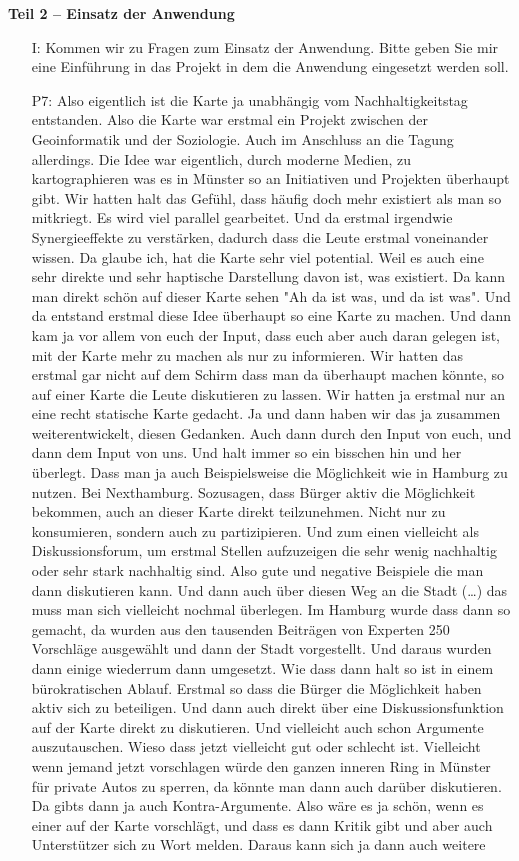 \textbf{Teil 2 -- Einsatz der Anwendung}
\begin{itemize}
    \item[I:] Kommen wir zu Fragen zum Einsatz der Anwendung. Bitte geben Sie mir eine Einf{\"u}hrung in das Projekt in dem die Anwendung eingesetzt werden soll.
    \item[P7:] Also eigentlich ist die Karte ja unabh{\"a}ngig vom Nachhaltigkeitstag entstanden. Also die Karte war erstmal ein Projekt zwischen der Geoinformatik und der Soziologie. Auch im Anschluss an die Tagung allerdings. Die Idee war eigentlich, durch moderne Medien, zu kartographieren was es in M{\"u}nster so an Initiativen und Projekten {\"u}berhaupt gibt. Wir hatten halt das Gef{\"u}hl, dass h{\"a}ufig doch mehr existiert als man so mitkriegt. Es wird viel parallel gearbeitet. Und da erstmal irgendwie Synergieeffekte zu verst{\"a}rken, dadurch dass die Leute erstmal voneinander wissen. Da glaube ich, hat die Karte sehr viel potential. Weil es auch eine sehr direkte und sehr haptische Darstellung davon ist, was existiert. Da kann man direkt sch{\"o}n auf dieser Karte sehen "Ah da ist was, und da ist was". Und da entstand erstmal diese Idee {\"u}berhaupt so eine Karte zu machen. Und dann kam ja vor allem von euch der Input, dass euch aber auch daran gelegen ist, mit der Karte mehr zu machen als nur zu informieren. Wir hatten das erstmal gar nicht auf dem Schirm dass man da {\"u}berhaupt machen k{\"o}nnte, so auf einer Karte die Leute diskutieren zu lassen. Wir hatten ja erstmal nur an eine recht statische Karte gedacht. Ja und dann haben wir das ja zusammen weiterentwickelt, diesen Gedanken. Auch dann durch den Input von euch, und dann dem Input von uns. Und halt immer so ein bisschen hin und her {\"u}berlegt. Dass man ja auch Beispielsweise die M{\"o}glichkeit wie in Hamburg zu nutzen. Bei Nexthamburg. Sozusagen, dass B{\"u}rger aktiv die M{\"o}glichkeit bekommen, auch an dieser Karte direkt teilzunehmen. Nicht nur zu konsumieren, sondern auch zu partizipieren. Und zum einen vielleicht als Diskussionsforum, um erstmal Stellen aufzuzeigen die sehr wenig nachhaltig oder sehr stark nachhaltig sind. Also gute und negative Beispiele die man dann diskutieren kann. Und dann auch {\"u}ber diesen Weg an die Stadt (\dots) das muss man sich vielleicht nochmal {\"u}berlegen. Im Hamburg wurde dass dann so gemacht, da wurden aus den tausenden Beitr{\"a}gen von Experten 250 Vorschl{\"a}ge ausgew{\"a}hlt und dann der Stadt vorgestellt. Und daraus wurden dann einige wiederrum dann umgesetzt. Wie dass dann halt so ist in einem b{\"u}rokratischen Ablauf. Erstmal so dass die B{\"u}rger die M{\"o}glichkeit haben aktiv sich zu beteiligen. Und dann auch direkt {\"u}ber eine Diskussionsfunktion auf der Karte direkt zu diskutieren. Und vielleicht auch schon Argumente auszutauschen. Wieso dass jetzt vielleicht gut oder schlecht ist. Vielleicht wenn jemand jetzt vorschlagen w{\"u}rde den ganzen inneren Ring in M{\"u}nster f{\"u}r private Autos zu sperren, da k{\"o}nnte man dann auch dar{\"u}ber diskutieren. Da gibts dann ja auch Kontra-Argumente. Also w{\"a}re es ja sch{\"o}n, wenn es einer auf der Karte vorschl{\"a}gt, und dass es dann Kritik gibt und aber auch Unterst{\"u}tzer sich zu Wort melden. Daraus kann sich ja dann auch weitere 
\end{itemize}
